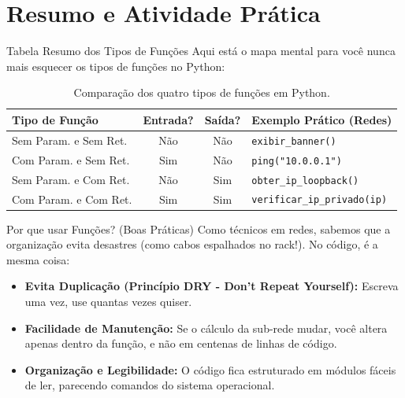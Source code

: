 \section{Resumo e Atividade Prática}

\begin{frame}{Tabela Resumo dos Tipos de Funções}
    Aqui está o mapa mental para você nunca mais esquecer os tipos de funções no Python:
    
    \vspace{0.4cm}
    \begin{table}
        \centering
        \begin{tabular}{lccl}
            \toprule
            \textbf{Tipo de Função} & \textbf{Entrada?} & \textbf{Saída?} & \textbf{Exemplo Prático (Redes)} \\
            \midrule
            Sem Param. e Sem Ret. & Não & Não & \texttt{exibir\_banner()} \\
            Com Param. e Sem Ret. & Sim & Não & \texttt{ping("10.0.0.1")} \\
            Sem Param. e Com Ret. & Não & Sim & \texttt{obter\_ip\_loopback()} \\
            Com Param. e Com Ret. & Sim & Sim & \texttt{verificar\_ip\_privado(ip)} \\
            \bottomrule
        \end{tabular}
        \caption{Comparação dos quatro tipos de funções em Python.}
    \end{table}
\end{frame}

\begin{frame}{Por que usar Funções? (Boas Práticas)}
    Como técnicos em redes, sabemos que a organização evita desastres (como cabos espalhados no rack!). No código, é a mesma coisa:
    
    \vspace{0.3cm}
    \begin{itemize}
        \item \textbf{Evita Duplicação (Princípio DRY - Don't Repeat Yourself):} Escreva uma vez, use quantas vezes quiser.
        \item \textbf{Facilidade de Manutenção:} Se o cálculo da sub-rede mudar, você altera apenas dentro da função, e não em centenas de linhas de código.
        \item \textbf{Organização e Legibilidade:} O código fica estruturado em módulos fáceis de ler, parecendo comandos do sistema operacional.
    \end{itemize}
\end{frame}

